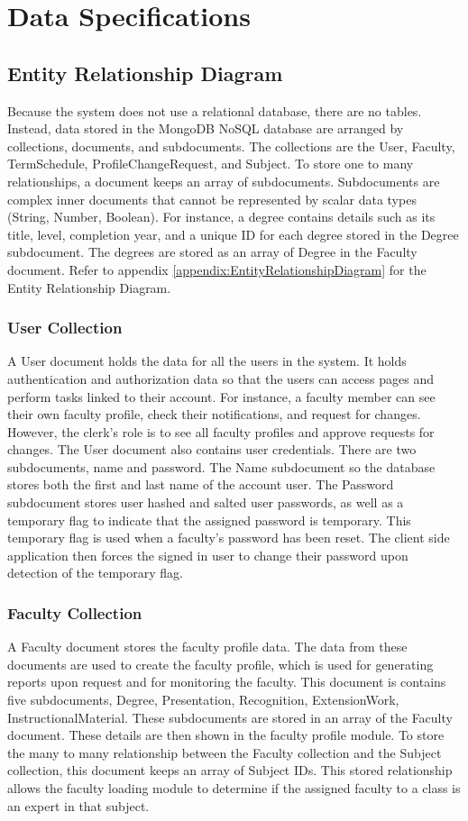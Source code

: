 \section{Data Specifications}

\subsection{Entity Relationship Diagram}
Because the system does not use a relational database, there are no tables. Instead, data stored in the MongoDB NoSQL database are arranged by collections, documents, and subdocuments. The collections are the User, Faculty, TermSchedule, ProfileChangeRequest, and Subject. To store one to many relationships, a document keeps an array of subdocuments. Subdocuments are complex inner documents that cannot be represented by scalar data types (String, Number, Boolean). For instance, a degree contains details such as its title, level, completion year, and a unique ID for each degree stored in the Degree subdocument. The degrees are stored as an array of Degree in the Faculty document. Refer to appendix \ref{appendix:EntityRelationshipDiagram} for the Entity Relationship Diagram.

\subsubsection{User Collection}
A User document holds the data for all the users in the system. It holds authentication and authorization data so that the users can access pages and perform tasks linked to their account. For instance, a faculty member can see their own faculty profile, check their notifications, and request for changes. However, the clerk's role is to see all faculty profiles and approve requests for changes. The User document also contains user credentials. There are two subdocuments, name and password. The Name subdocument so the database stores both the first and last name of the account user. The Password subdocument stores user hashed and salted user passwords, as well as a temporary flag to indicate that the assigned password is temporary. This temporary flag is used when a faculty's password has been reset. The client side application then forces the signed in user to change their password upon detection of the temporary flag.

\subsubsection{Faculty Collection}
A Faculty document stores the faculty profile data. The data from these documents are used to create the faculty profile, which is used for generating reports upon request and for monitoring the faculty. This document is contains five subdocuments, Degree, Presentation, Recognition, ExtensionWork, InstructionalMaterial. These subdocuments are stored in an array of the Faculty document. These details are then shown in the faculty profile module. To store the many to many relationship between the Faculty collection and the Subject collection, this document keeps an array of Subject IDs. This stored relationship allows the faculty loading module to determine if the assigned faculty to a class is an expert in that subject.

